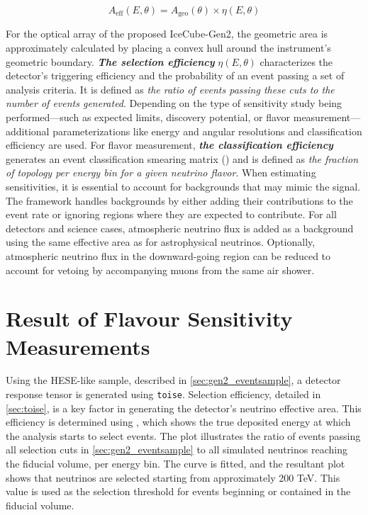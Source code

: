 \begin{equation}
    A_{\text{eff}}(E, \theta) = A_{\text{geo}}(\theta) \times \eta(E, \theta)
\end{equation}

For the optical array of the proposed IceCube-Gen2, the geometric area is approximately calculated by placing a convex hull around the instrument's geometric boundary. \textbf{\emph{The selection efficiency}} \( \eta(E, \theta) \) characterizes the detector's triggering efficiency and the probability of an event passing a set of analysis criteria. It is defined as \emph{the ratio of events passing these cuts to the number of events generated}. Depending on the type of sensitivity study being performed—such as expected limits, discovery potential, or flavor measurement—additional parameterizations like energy and angular resolutions and classification efficiency are used. For flavor measurement, \textbf{\emph{the classification efficiency}} generates an event classification smearing matrix () and is defined as \emph{the fraction of topology per energy bin for a given neutrino flavor}.
When estimating sensitivities, it is essential to account for backgrounds that may mimic the signal. The framework handles backgrounds by either adding their contributions to the event rate or ignoring regions where they are expected to contribute. For all detectors and science cases, atmospheric neutrino flux is added as a background using the same effective area as for astrophysical neutrinos. Optionally, atmospheric neutrino flux in the downward-going region can be reduced to account for vetoing by accompanying muons from the same air shower.

 
\section{Result of Flavour Sensitivity Measurements}
\label{sec:gen2-results}
Using the HESE-like sample, described in \ref{sec:gen2_eventsample}, a detector response tensor is generated using \texttt{toise}. Selection efficiency, detailed in \ref{sec:toise}, is a key factor in generating the detector's neutrino effective area. This efficiency is determined using , which shows the true deposited energy at which the analysis starts to select events. The plot illustrates the ratio of events passing all selection cuts in \ref{sec:gen2_eventsample} to all simulated neutrinos reaching the fiducial volume, per energy bin. The curve is fitted, and the resultant plot shows that neutrinos are selected starting from approximately 200 TeV. This value is used as the selection threshold for events beginning or contained in the fiducial volume.

